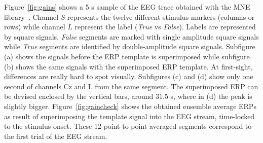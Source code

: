 \documentclass[brainsci,article,accept,moreauthors,pdftex,10pt,a4paper]{mdpi}
\begin{document}
Figure~\ref{fig:gains} shows a 5 s sample of the EEG trace obtained with the MNE library~\citep{Gramfort2013}.  Channel $S$ represents the twelve different stimulus markers (columns or rows) while channel $L$ represent the label (\textit{True} vs \textit{False}).  Labels are represented by square signals.  \textit{False} segments are marked with single amplitude square signals while \textit{True} segments are identified by double-amplitude square signals.  Subfigure (a) shows the signals before the ERP template is superimposed while subfigure (b) shows the same signals with the superimposed ERP template.  At first-sight, differences are really hard to spot visually.  Subfigures (c) and (d) show only one second of channels Cz and L from the same segment.  The superimposed ERP can be devised enclosed by the vertical bars, around $31.5$ s, where in (d) the peak is slightly bigger.  Figure~\ref{fig:gaincheck} shows the obtained ensemble average ERPs as result of superimposing the template signal into the EEG stream, time-locked to the stimulus onset.   These 12 point-to-point averaged segments correspond to the first trial of the EEG stream.
\end{document}
